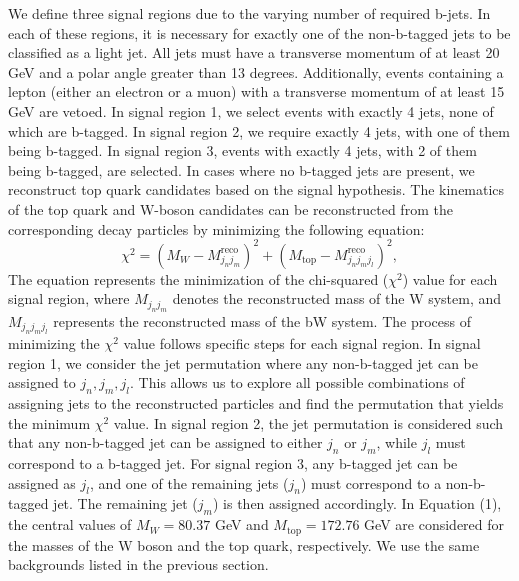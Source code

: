 \documentclass[11pt,onecolumn,english,showpacs,preprintnumbers,amsmath,amssymb,floatfix,nofootinbib]{revtex4-1}
\begin{document}
We define three signal regions due to the varying number of required b-jets. In each of these regions, it is necessary for exactly one of the non-b-tagged jets to be classified as a light jet. All jets must have a transverse momentum of at least 20 GeV and a polar angle greater than 13 degrees. Additionally, events containing a lepton (either an electron or a muon) with a transverse momentum of at least 15 GeV are vetoed.
In signal region 1, we select events with exactly 4 jets, none of which are b-tagged. In signal region 2, we require exactly 4 jets, with one of them being b-tagged. In signal region 3, events with exactly 4 jets, with 2 of them being b-tagged, are selected.
In cases where no b-tagged jets are present, we reconstruct top quark candidates based on the signal hypothesis. The kinematics of the top quark and W-boson candidates can be reconstructed from the corresponding decay particles by minimizing the following equation:
\begin{equation}\label{xi2}
  \chi^2 = (M_W - M_{j_nj_m}^{\text{reco}})^2 + (M_{\text{top}}-M_{j_n j_m j_l}^{\text{reco}})^2,
\end{equation}
The equation represents the minimization of the chi-squared ($\chi^2$) value for each signal region, where $M_{j_nj_m}$ denotes the reconstructed mass of the W system, and $M_{j_n j_m j_l}$ represents the reconstructed mass of the bW system. The process of minimizing the $\chi^2$ value follows specific steps for each signal region.
In signal region 1, we consider the jet permutation where any non-b-tagged jet can be assigned to $j_n, j_m, j_l$. This allows us to explore all possible combinations of assigning jets to the reconstructed particles and find the permutation that yields the minimum $\chi^2$ value.
In signal region 2, the jet permutation is considered such that any non-b-tagged jet can be assigned to either $j_n$ or $j_m$, while $j_l$ must correspond to a b-tagged jet.
For signal region 3, any b-tagged jet can be assigned as $j_l$, and one of the remaining jets ($j_n$) must correspond to a non-b-tagged jet. The remaining jet ($j_m$) is then assigned accordingly.
In Equation (1), the central values of $M_W = 80.37$ GeV and $M_{\text{top}} = 172.76$ GeV are considered for the masses of the W boson and the top quark, respectively.
We use the same backgrounds listed in the previous section.   
\end{document}
